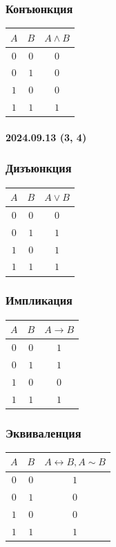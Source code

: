 \documentclass{article}
\begin{document}
\subsubsection{Конъюнкция}
\begin{tabular}{c|c|c}
    $A$ & $B$ & $A \wedge B$ \\
    \hline
    $0$ & $0$ & $0$ \\
    $0$ & $1$ & $0$ \\
    $1$ & $0$ & $0$ \\
    $1$ & $1$ & $1$ 
\end{tabular}

\paragraph{2024.09.13 (3, 4)}
\subsubsection{Дизъюнкция}
\begin{tabular}{c|c|c}
    $A$ & $B$ & $A \vee B$ \\
    \hline
    $0$ & $0$ & $0$ \\
    $0$ & $1$ & $1$ \\
    $1$ & $0$ & $1$ \\
    $1$ & $1$ & $1$ 
\end{tabular}

\subsubsection{Импликация}
\begin{tabular}{c|c|c}
    $A$ & $B$ & $A \rightarrow B$ \\
    \hline
    $0$ & $0$ & $1$ \\
    $0$ & $1$ & $1$ \\
    $1$ & $0$ & $0$ \\
    $1$ & $1$ & $1$ 
\end{tabular}

\subsubsection{Эквиваленция}
\begin{tabular}{c|c|c}
    $A$ & $B$ & $A \leftrightarrow B, A \sim B$ \\
    \hline
    $0$ & $0$ & $1$ \\
    $0$ & $1$ & $0$ \\
    $1$ & $0$ & $0$ \\
    $1$ & $1$ & $1$ 
\end{tabular}
\end{document}

